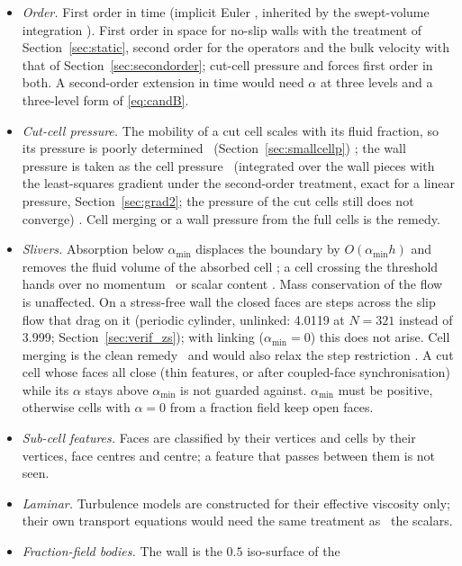\documentclass[11pt,a4paper]{article}
\theoremstyle{remark}
\begin{document}
\begin{itemize}\itemsep2pt
\item \emph{Order.} First order in time (implicit Euler%
      , inherited by the swept-volume integration%
      ).
      First order in space for no-slip walls with the treatment of
      Section~\ref{sec:static}, second order for the operators and the bulk velocity with that
      of Section~\ref{sec:secondorder}; cut-cell pressure and forces first order in both.
      A second-order extension in time would need $\alpha$ at three levels and a
      three-level form of \eqref{eq:candB}.
\item \emph{Cut-cell pressure.} The mobility of a cut cell scales with its fluid fraction, so
      its pressure is poorly determined%
      \ (Section~\ref{sec:smallcellp})%
      ; the wall pressure is taken as the cell pressure%
      \ (integrated over the wall pieces with the least-squares gradient under the
      second-order treatment, exact for a linear pressure, Section~\ref{sec:grad2};
      the pressure of the cut cells still does not converge)%
      . Cell merging or a wall pressure from the full cells is the remedy.
\item \emph{Slivers.} Absorption below $\alpha_{\min}$ displaces the boundary by
      $O(\alpha_{\min}h)$ and removes the fluid volume of the absorbed cell%
      ; a cell crossing the threshold hands over no momentum%
      \ or scalar content%
      . Mass conservation of the flow is unaffected. On a stress-free wall the closed faces are steps
      across the slip flow that drag on it (periodic cylinder, unlinked: 4.0119 at $N=321$ instead of
      3.999; Section~\ref{sec:verif_zs}); with linking ($\alpha_{\min}=0$) this does not arise. Cell merging is the clean remedy%
      \ and would also relax the step restriction%
      . A cut cell whose faces all close (thin features, or after coupled-face
      synchronisation) while its $\alpha$ stays above $\alpha_{\min}$ is not guarded against.
      $\alpha_{\min}$ must be positive, otherwise cells with $\alpha=0$ from a fraction field keep
      open faces.
\item \emph{Sub-cell features.} Faces are classified by their vertices and cells by their
      vertices, face centres and centre; a feature that passes between them is not seen.
\item \emph{Laminar.} Turbulence models are constructed for their effective viscosity only;
      their own transport equations would need the same treatment as%
      \ the scalars.
\item \emph{Fraction-field bodies.} The wall is the $0.5$ iso-surface of the

\end{itemize}
\end{document}
